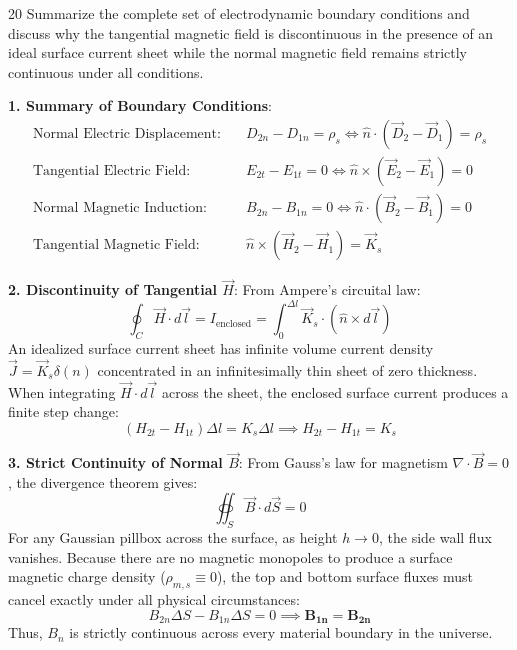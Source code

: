 \begin{theoryq}{20}
Summarize the complete set of electrodynamic boundary conditions and discuss why the tangential magnetic field is discontinuous in the presence of an ideal surface current sheet while the normal magnetic field remains strictly continuous under all conditions.
\end{theoryq}
\begin{theorysol}
\textbf{1. Summary of Boundary Conditions}:
\begin{align}
\text{Normal Electric Displacement:}\quad &D_{2n} - D_{1n} = \rho_s \iff \hat{n}\cdot(\vec{D}_2 - \vec{D}_1) = \rho_s \\
\text{Tangential Electric Field:}\quad &E_{2t} - E_{1t} = 0 \iff \hat{n}\times(\vec{E}_2 - \vec{E}_1) = 0 \\
\text{Normal Magnetic Induction:}\quad &B_{2n} - B_{1n} = 0 \iff \hat{n}\cdot(\vec{B}_2 - \vec{B}_1) = 0 \\
\text{Tangential Magnetic Field:}\quad &\hat{n}\times(\vec{H}_2 - \vec{H}_1) = \vec{K}_s
\end{align}

\textbf{2. Discontinuity of Tangential $\vec{H}$}:
From Ampere's circuital law:
\begin{equation}
\oint_C \vec{H}\cdot d\vec{l} = I_{\text{enclosed}} = \int_0^{\Delta l} \vec{K}_s \cdot (\hat{n}\times d\vec{l})
\end{equation}
An idealized surface current sheet has infinite volume current density $\vec{J} = \vec{K}_s \delta(n)$ concentrated in an infinitesimally thin sheet of zero thickness. When integrating $\vec{H}\cdot d\vec{l}$ across the sheet, the enclosed surface current produces a finite step change:
\begin{equation}
(H_{2t} - H_{1t})\Delta l = K_s \Delta l \implies H_{2t} - H_{1t} = K_s
\end{equation}

\textbf{3. Strict Continuity of Normal $\vec{B}$}:
From Gauss's law for magnetism $\nabla \cdot \vec{B} = 0$, the divergence theorem gives:
\begin{equation}
\oiint_S \vec{B}\cdot d\vec{S} = 0
\end{equation}
For any Gaussian pillbox across the surface, as height $h \to 0$, the side wall flux vanishes. Because there are no magnetic monopoles to produce a surface magnetic charge density ($\rho_{m,s} \equiv 0$), the top and bottom surface fluxes must cancel exactly under all physical circumstances:
\begin{equation}
B_{2n}\Delta S - B_{1n}\Delta S = 0 \implies \mathbf{B_{1n} = B_{2n}}
\end{equation}
Thus, $B_n$ is strictly continuous across every material boundary in the universe.
\end{theorysol}
\vspace{4mm}
